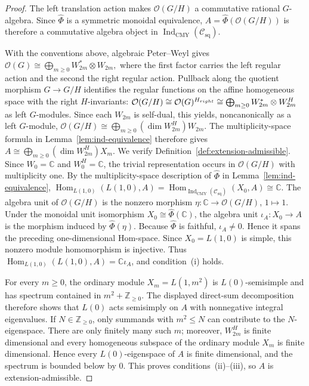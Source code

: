 \documentclass[10pt,a4paper]{amsart}
\numberwithin{equation}{section} \newtheorem{thm}{Theorem}[section] \newtheorem{lem}[thm]{Lemma} \newtheorem{ex}[thm]{Example} \newtheorem{prop}[thm]{Proposition} \newtheorem{cor}[thm]{Corollary} \newtheorem{defi}[thm]{Definition} \newtheorem{rmk}[thm]{Remark} \newtheorem{notation}[thm]{Notation}
\newcommand{\Hom}{\operatorname{Hom}}
\newcommand{\OO}{\mathcal O}
\newcommand{\Csq}{\mathcal C_{\mathrm{sq}}}
\newcommand{\IndCMY}{\operatorname{Ind}_{\mathrm{CMY}}}
\def\Z{\mathbb{Z}} \def\N{\mathbb{N}} \def\A{\mathbb{A}} \def\C{\mathbb{C}} \def\R{\mathbb{R}} \def\Q{\mathbb{Q}} \def\F{\mathbb{F}}
\begin{document}
\begin{proof}
The left translation action makes $\OO(G/H)$ a commutative rational $G$-algebra. Since $\widehat\Phi$ is a symmetric monoidal equivalence, $A=\widehat\Phi(\OO(G/H))$ is therefore a commutative algebra object in $\IndCMY(\Csq)$.

With the conventions above, algebraic Peter--Weyl gives \(\OO(G)\cong\bigoplus_{m\ge0}W_{2m}^*\otimes W_{2m},\) where the first factor carries the left regular action and the second the right regular action. Pullback along the quotient morphism $G\to G/H$ identifies the regular functions on the affine homogeneous space with the right $H$-invariants: \(\OO(G/H)\cong\OO(G)^{H_{\rm right}}\cong\bigoplus_{m\ge0}W_{2m}^*\otimes W_{2m}^H\) as left $G$-modules. Since each $W_{2m}$ is self-dual, this yields, noncanonically as a left $G$-module, \(\OO(G/H)\cong\bigoplus_{m\ge0}(\dim W_{2m}^H) W_{2m}.\) The multiplicity-space formula in Lemma~\ref{lem:ind-equivalence} therefore gives \(A\cong\bigoplus_{m\ge0}(\dim W_{2m}^H) X_m.\) We verify Definition~\ref{def:extension-admissible}. Since $W_0=\C$ and $W_0^H=\C$, the trivial representation occurs in $\OO(G/H)$ with multiplicity one. By the multiplicity-space description of $\widehat\Phi$ in Lemma~\ref{lem:ind-equivalence}, \(\Hom_{L(1,0)}(L(1,0),A)=\Hom_{\IndCMY(\Csq)}(X_0,A)\cong\C.\) The algebra unit of $\OO(G/H)$ is the nonzero morphism $\eta:\C\to\OO(G/H)$, $1\mapsto1$. Under the monoidal unit isomorphism $X_0\cong\widehat\Phi(\C)$, the algebra unit $\iota_A:X_0\to A$ is the morphism induced by $\widehat\Phi(\eta)$. Because $\widehat\Phi$ is faithful, $\iota_A\ne0$. Hence it spans the preceding one-dimensional Hom-space. Since $X_0=L(1,0)$ is simple, this nonzero module homomorphism is injective. Thus \(\Hom_{L(1,0)}(L(1,0),A)=\C\iota_A\), and condition~\textnormal{(i)} holds.

For every $m\ge0$, the ordinary module $X_m=L(1,m^2)$ is $L(0)$-semisimple and has spectrum contained in $m^2+\Z_{\ge0}$. The displayed direct-sum decomposition therefore shows that $L(0)$ acts semisimply on $A$ with nonnegative integral eigenvalues. If $N\in\Z_{\ge0}$, only summands with $m^2\le N$ can contribute to the $N$-eigenspace. There are only finitely many such $m$; moreover, $W_{2m}^H$ is finite dimensional and every homogeneous subspace of the ordinary module $X_m$ is finite dimensional. Hence every $L(0)$-eigenspace of $A$ is finite dimensional, and the spectrum is bounded below by $0$. This proves conditions~\textnormal{(ii)}--\textnormal{(iii)}, so $A$ is extension-admissible.
\end{proof}
\end{document}
